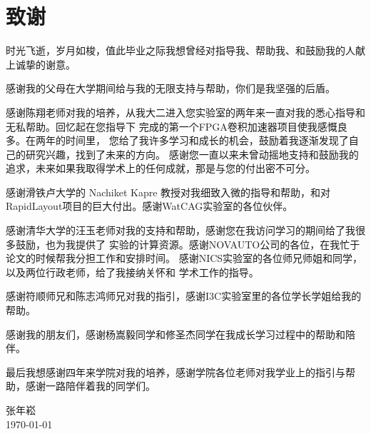 \chapter{致谢}





时光飞逝，岁月如梭，值此毕业之际我想曾经对指导我、帮助我、和鼓励我的人献上诚挚的谢意。

感谢我的父母在大学期间给与我的无限支持与帮助，你们是我坚强的后盾。

感谢陈翔老师对我的培养，从我大二进入您实验室的两年来一直对我的悉心指导和无私帮助。回忆起在您指导下
完成的第一个FPGA卷积加速器项目使我感慨良多。在两年的时间里，
您给了我许多学习和成长的机会，鼓励着我逐渐发现了自己的研究兴趣，找到了未来的方向。
感谢您一直以来未曾动摇地支持和鼓励我的追求，未来如果我取得学术上的任何成就，那是与您的付出密不可分。

感谢滑铁卢大学的 Nachiket Kapre 教授对我细致入微的指导和帮助，和对
RapidLayout项目的巨大付出。感谢WatCAG实验室的各位伙伴。

感谢清华大学的汪玉老师对我的支持和帮助，感谢您在我访问学习的期间给了我很多鼓励，也为我提供了
实验的计算资源。感谢NOVAUTO公司的各位，在我忙于论文的时候帮我分担工作和安排时间。
感谢NICS实验室的各位师兄师姐和同学，以及两位行政老师，给了我接纳关怀和
学术工作的指导。


感谢符顺师兄和陈志鸿师兄对我的指引，感谢I3C实验室里的各位学长学姐给我的帮助。

感谢我的朋友们，感谢杨嵩毅同学和修圣杰同学在我成长学习过程中的帮助和陪伴。

最后我想感谢四年来学院对我的培养，感谢学院各位老师对我学业上的指引与帮助，感谢一路陪伴着我的同学们。








\vskip 108pt
\begin{flushright}
	张年崧\makebox[1cm]{} \\
	\today
\end{flushright}


